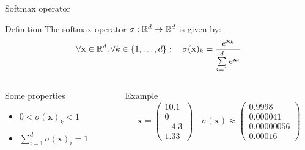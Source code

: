 \documentclass[xcolor=pdftex,dvipsnames,table,mathserif]{beamer}
\newcommand{\myvec}[1]{\ensuremath{\begin{pmatrix}#1\end{pmatrix}}}
\begin{document}
\begin{frame}{Softmax operator}

  \begin{block}{Definition}
    The softmax operator $\sigma: \mathbb{R}^d \rightarrow \mathbb{R}^d$ is given by:
    \[
    \forall \mathbf{x}  \in \mathbb{R}^d, \forall k \in \{1, \ldots, d\}:\quad \sigma(\mathbf{x})_k = \frac{e^{\mathbf{x}_k}}{\sum\limits_{i=1}^d e^{\mathbf{x}_i}}
    \]
  \end{block}

  \pause

  \begin{columns}
    \begin{column}{.3\textwidth}
      \begin{block}{Some properties}
        \begin{itemize}
        \item $0 < \sigma(\mathbf{x})_k < 1$
        \item $\sum\limits_{i=1}^d \sigma(\mathbf{x})_i = 1$
        \end{itemize}
      \end{block}

    \end{column}

    \pause

    \begin{column}{.7\textwidth}

      \begin{block}{Example}
        \[
        \mathbf{x} = \myvec{10.1\\0\\-4.3\\1.33}  \quad \sigma(\mathbf{x}) \approx \myvec{0.9998\\0.000041\\0.00000056\\0.00016}
        \]

      \end{block}



    \end{column}
  \end{columns}



\end{frame}
\end{document}
